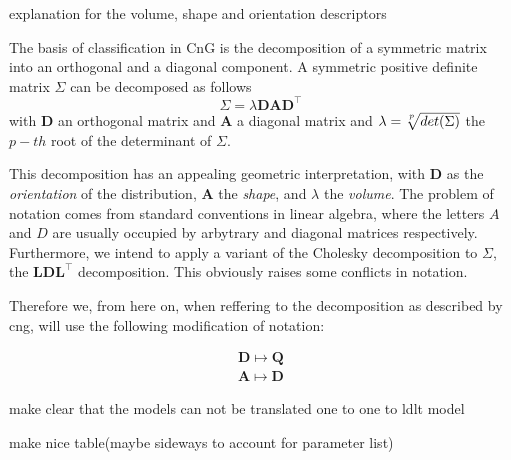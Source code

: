 explanation for the volume, shape and orientation descriptors

The basis of classification in CnG is the decomposition of a symmetric matrix into
an orthogonal and a diagonal component.
A symmetric positive definite matrix $ \Sigma $ can be decomposed as follows
\[ \Sigma = \lambda \pmb{D} \pmb{A} \pmb{D}^{\top} \]
with $ \pmb{D} $ an orthogonal matrix and $ \pmb{A} $ a diagonal matrix and 
$ \lambda = \sqrt[\uproot{3}p]{det(\Sigma)} $ the $ p-th $ root of the determinant 
of $ \Sigma $.

This decomposition has an appealing geometric interpretation, with $ \pmb{D} $ 
as the \textit{orientation} of the distribution, $ \pmb{A} $ the \textit{shape}, and $ \lambda $
the \textit{volume}.
The problem of notation comes from standard conventions in linear algebra, where
the letters $A$ and $D$ are usually occupied by arbytrary and diagonal matrices 
respectively. Furthermore, we intend to apply a variant of the Cholesky decomposition
to $ \Sigma $, the $ \pmb{L}\pmb{D}\pmb{L}^{\top} $ decomposition.
This obviously raises some conflicts in notation.

Therefore we, from here on, when reffering to the decomposition as described
by cng, will use the following modification of notation:

\begin{align*} 
	\pmb{D} \longmapsto \pmb{Q} \\
	\pmb{A} \longmapsto \pmb{D} 
\end{align*}

make clear that the models can not be translated one to one to ldlt model

make nice table(maybe sideways to account for parameter list)


